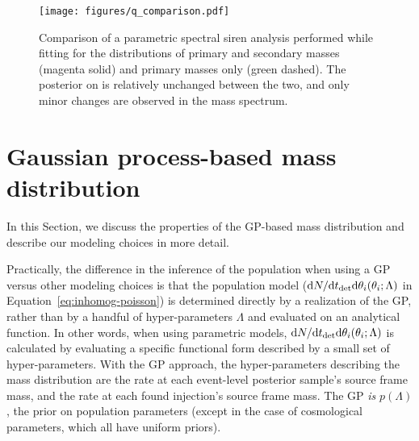 \documentclass[preprint2,linenumbers]{aastex631}
\begin{document}
\begin{figure*}
    \texttt{[image: figures/q\_comparison.pdf]}
    \caption{Comparison of a parametric spectral siren analysis performed while fitting for the distributions of primary and secondary masses (magenta solid) and primary masses only (green dashed).
    The posterior on \Ho{} is relatively unchanged between the two, and only minor changes are observed in the mass spectrum.}
    \label{fig:mass ratio}
\end{figure*}

\section{Gaussian process-based mass distribution}
\label{ap:GP}

In this Section, we discuss the properties of the \ac{GP}-based mass distribution and describe our modeling choices in more detail. %

Practically, the difference in the inference of the population when using a \ac{GP} versus other modeling choices is that the population model ($\text{d} N/\text{d} t_{\det} \text{d} \theta_i (\theta_i;\Lambda)$ in Equation~\ref{eq:inhomog-poisson}) is determined directly by a realization of the \ac{GP}, rather than by a handful of hyper-parameters $\Lambda$ and evaluated on an analytical function.
In other words, when using parametric models, $\text{d} N/\text{d} t_{\det} \text{d} \theta_i (\theta_i;\Lambda)$ is calculated by evaluating a specific functional form described by a small set of hyper-parameters. 
With the \ac{GP} approach, the hyper-parameters describing the mass distribution are the rate at each event-level posterior sample's source frame mass, and the rate at each found injection's source frame mass.
The \ac{GP} \emph{is} $p(\Lambda)$, the prior on population parameters (except in the case of cosmological parameters, which all have uniform priors).
\end{document}
